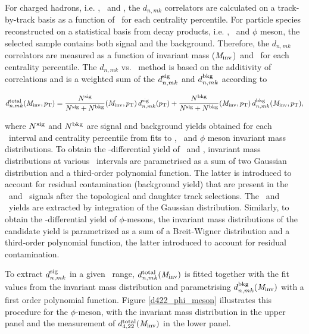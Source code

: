 \documentclass[ALICE,manyauthors]{cernphprep}
\begin{document}
For charged hadrons, i.e. \pion, \kaon~and \proton, the $d_{n,mk}$ correlators are calculated on a track-by-track basis as a function of \pT~for each centrality percentile. For particle species reconstructed on a statistical basis from decay products, i.e. \Ks, \lambdas~and $\phi$ meson, the selected sample contains both signal and the background. Therefore, the $d_{n,mk}$ correlators are measured as a function of invariant mass (${\it M}_{\rm inv}$)~and \pT~for each centrality percentile. The $d_{n,mk}$ vs. \minv~method is based on the additivity of correlations and is a weighted sum of the $d_{n,mk}^{\rm{sig}}$ and $d_{n,mk}^{\rm{bkg}}$ according to

\begin{equation}
d_{n,mk}^{\rm total}({\it M}_{\rm inv}, p_{\rm T}) = \frac{N^{\rm sig}}{N^{\rm sig}+N^{\rm bkg}}({\it M}_{\rm inv}, p_{\rm T})\,d_{n,mk}^{\rm sig}(p_{\rm T})+\frac{N^{\rm bkg}}{N^{{\rm sig}}+N^{{\rm bkg}}}({\it M}_{\rm inv}, p_{\rm T})\,d_{n,mk}^{\rm bkg}({\it M}_{\rm inv}, p_{\rm T}),
\label{Eq:dnmk}
\end{equation}

where $N^{\rm{sig}}$ and $N^{\rm{bkg}}$ are signal and background yields obtained for each \pT~interval and centrality percentile from fits to \Ks, \lambdas~and $\phi$ meson invariant mass distributions. To obtain the \pT-differential yield of \Ks~and \lambdas, invariant mass distributions at various \pT~intervals are parametrised as a sum of two Gaussian distribution and a third-order polynomial function. The latter is introduced to account for residual contamination (background yield) that are present in the \Ks~and \lambdas~signals after the topological and daughter track selections. The \Ks~and \lambdas~yields are extracted by integration of the Gaussian distribution. %
Similarly, to obtain the \pT-differential yield of $\phi$-mesons, the invariant mass distributions of the candidate yield is parametrized as a sum of a Breit-Wigner distribution and a third-order polynomial function, the latter introduced to account for residual contamination.

To extract $d_{n,mk}^{\rm{sig}}$ in a given \pT~range, $d_{n,mk}^{\rm total}({\it M}_{\rm inv})$ is fitted together with the fit values from the invariant mass distribution and parametrising $d_{n,mk}^{\rm{bkg}}({\it M}_{\rm inv})$ with a first order polynomial function. Figure \ref{d422_phi_meson} illustrates this procedure for the $\phi$-meson, with the invariant mass distribution in the upper panel and the measurement of $d_{4,22}^{\rm total}({\it M}_{\rm inv})$ in the lower panel. 
\end{document}

